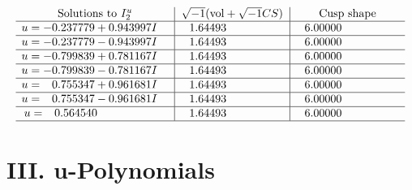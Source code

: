\documentclass[1p]{elsarticle_modified}
\theoremstyle{definition}
\newcommand{\I}{\sqrt{-1}}
\begin{document}
$$\begin{array}{c|c|c}  
\text{Solutions to }I^u_{2}& \I (\text{vol} + \sqrt{-1}CS) & \text{Cusp shape}\\
 \hline 
\begin{aligned}
u &= -0.237779 + 0.943997 I\end{aligned}
 & \phantom{-}1.64493\phantom{ +0.000000I} & \phantom{-}6.00000\phantom{ +0.000000I} \\ \hline\begin{aligned}
u &= -0.237779 - 0.943997 I\end{aligned}
 & \phantom{-}1.64493\phantom{ +0.000000I} & \phantom{-}6.00000\phantom{ +0.000000I} \\ \hline\begin{aligned}
u &= -0.799839 + 0.781167 I\end{aligned}
 & \phantom{-}1.64493\phantom{ +0.000000I} & \phantom{-}6.00000\phantom{ +0.000000I} \\ \hline\begin{aligned}
u &= -0.799839 - 0.781167 I\end{aligned}
 & \phantom{-}1.64493\phantom{ +0.000000I} & \phantom{-}6.00000\phantom{ +0.000000I} \\ \hline\begin{aligned}
u &= \phantom{-}0.755347 + 0.961681 I\end{aligned}
 & \phantom{-}1.64493\phantom{ +0.000000I} & \phantom{-}6.00000\phantom{ +0.000000I} \\ \hline\begin{aligned}
u &= \phantom{-}0.755347 - 0.961681 I\end{aligned}
 & \phantom{-}1.64493\phantom{ +0.000000I} & \phantom{-}6.00000\phantom{ +0.000000I} \\ \hline\begin{aligned}
u &= \phantom{-}0.564540\phantom{ +0.000000I}\end{aligned}
 & \phantom{-}1.64493\phantom{ +0.000000I} & \phantom{-}6.00000\phantom{ +0.000000I}\\
 \hline 
 \end{array}$$\newpage
\newpage\renewcommand{\arraystretch}{1}
\centering \section*{ III. u-Polynomials}
\end{document}
